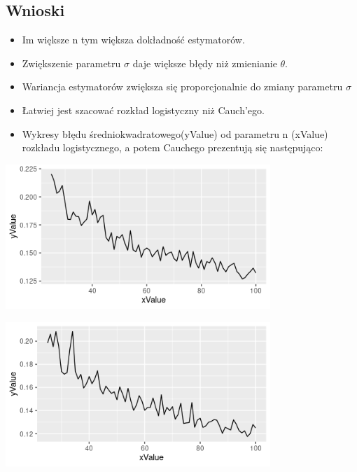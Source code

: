 \documentclass{memoir}
\begin{document}
\subsection*{Wnioski}
\begin{itemize}
\item Im większe n tym większa dokładność estymatorów.
\item Zwiększenie parametru $\sigma$ daje większe błędy niż zmienianie $\theta$.
\item Wariancja estymatorów zwiększa się proporcjonalnie do zmiany parametru $\sigma$
\item Łatwiej jest szacować rozkład logistyczny niż Cauch'ego.
\item Wykresy błędu średniokwadratowego(yValue) od parametru n (xValue) rozkładu logistycznego, a potem Cauchego prezentują się następująco:
\end{itemize}
\includegraphics[width=10cm]{wykmse1.png} 

\includegraphics[width=10cm]{wykmse2.png}
\end{document}
